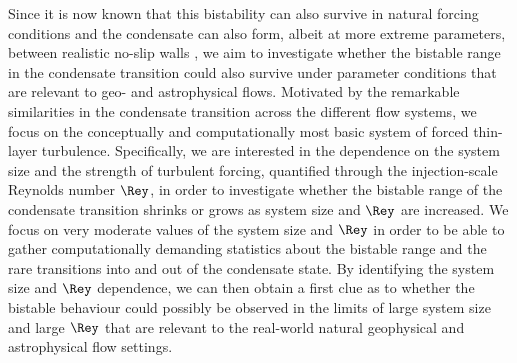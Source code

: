 \documentclass[]{jfm}
\begin{document}
Since it is now known that this bistability can also survive in natural forcing conditions \citep{Favier2019,DeWit2022} and the condensate can also form, albeit at more extreme parameters, between realistic no-slip walls \citep{Guzman2020}, we aim to investigate whether the bistable range in the condensate transition could also survive under parameter conditions that are relevant to geo- and astrophysical flows. Motivated by the remarkable similarities in the condensate transition across the different flow systems, we focus on the conceptually and computationally most basic system of forced thin-layer turbulence. Specifically, we are interested in the dependence on the system size and the strength of turbulent forcing, quantified through the injection-scale Reynolds number $\Rey$, in order to investigate whether the bistable range of the condensate transition shrinks or grows as system size and $\Rey$ are increased. We focus on very moderate values of the system size and $\Rey$ in order to be able to gather computationally demanding statistics about the bistable range and the rare transitions into and out of the condensate state. By identifying the system size and $\Rey$ dependence, we can then obtain a first clue as to whether the bistable behaviour could possibly be observed in the limits of large system size and large $\Rey$ that are relevant to the real-world natural geophysical and astrophysical flow settings.

\end{document}
